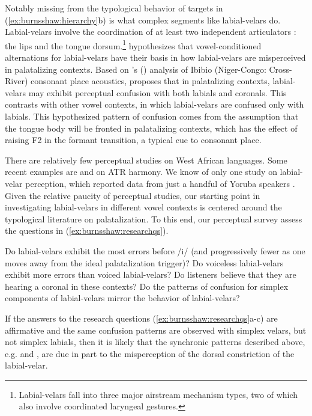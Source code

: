 \documentclass[output=paper,colorlinks,citecolor=brown
]{langscibook}
\begin{document}
\noindent Notably missing from the typological behavior of targets in (\ref{ex:burnsshaw:hierarchy}b) is what complex segments like labial-velars do. Labial-velars involve the coordination of at least two independent articulators \citep{Ladefoged1968}: the lips and the tongue dorsum.\footnote{Labial-velars fall into three major airstream mechanism types, two of which also involve coordinated laryngeal gestures.} \citet{Burns2023} hypothesizes that vowel-conditioned alternations for labial-velars have their basis in how labial-velars are misperceived in palatalizing contexts. Based on \citeauthor{Connell1994}'s (\citeyear{Connell1994}) analysis of Ibibio (Niger-Congo: Cross-River) consonant place acoustics, \citet{Burns2023} proposes that in palatalizing contexts, labial-velars may exhibit perceptual confusion with both labials and coronals. This contrasts with other vowel contexts, in which labial-velars are confused only with labials. This hypothesized pattern of confusion comes from the assumption that the tongue body will be fronted in palatalizing contexts, which has the effect of raising F2 in the formant transition, a typical cue to consonant place.

There are relatively few perceptual studies on West African languages. Some recent examples are \citet{Rose2023} and \citet{Ozburntoappear} on ATR harmony. We know of only one study on labial-velar perception, which reported data from just a handful of Yoruba speakers \citep{Cahill2006}. Given the relative paucity of perceptual studies, our starting point in investigating labial-velars in different vowel contexts is centered around the typological literature on palatalization. To this end, our perceptual survey assess the questions in (\ref{ex:burnsshaw:researchqs}).

\ea\label{ex:burnsshaw:researchqs}
\begin{xlist}
\ex Do labial-velars exhibit the most errors before /i/ (and progressively fewer as one moves away from the ideal palatalization trigger)?
\ex Do voiceless labial-velars exhibit more errors than voiced labial-velars?
\ex Do listeners believe that they are hearing a coronal in these contexts?
\ex Do the patterns of confusion for simplex components of labial-velars mirror the behavior of labial-velars?
 \end{xlist}
 \z

\noindent If the answers to the research questions (\ref{ex:burnsshaw:researchqs}a-c) are affirmative and the same confusion patterns are observed with simplex velars, but not simplex labials, then it is likely that the synchronic patterns described above, e.g.  and , are due in part to the misperception of the dorsal constriction of the labial-velar.
\end{document}
